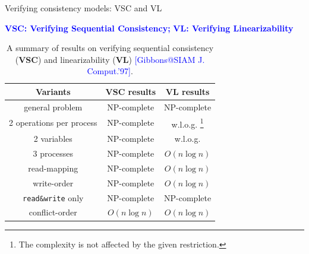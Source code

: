 \documentclass{beamer}
\makeatletter
\newcommand{\citeinbeamer}[3]{{\scriptsize{\textcolor{blue}{[#1@#2'#3]}}}}
\makeatother
\begin{document}
\begin{frame}{Verifying consistency models: VSC and VL}

  {\small \textcolor{blue}{\bf VSC: Verifying Sequential Consistency;}
  \textcolor{blue}{\bf VL: Verifying Linearizability}}

  \begin{table}[h]
    \centering
	\begin{tabular}{|c|c|c|}
      \hline
      {\bf \large Variants} & {\bf \large VSC results} & {\bf \large VL results}
      \\ \hline \hline
	  general problem & \textsf{NP}-complete & \textsf{NP}-complete
	  \\ \hline
	  2 operations per process & \textsf{NP}-complete & w.l.o.g.
	  \footnote[frame]{The complexity is not affected by the given restriction.}
	  \\
	  2 variables & \textsf{NP}-complete & w.l.o.g.\\
	  3 processes & \textsf{NP}-complete & $O(n \log n)$
	  \\ \hline
	  read-mapping & \textsf{NP}-complete &  $O(n \log n)$ \\
	  write-order & \textsf{NP}-complete &  $O(n \log n)$ \\
	  \texttt{read\&write} only & \textsf{NP}-complete & \textsf{NP}-complete \\
	  conflict-order & $O(n \log n)$ &  $O(n \log n)$
	  \\ \hline
	\end{tabular}
	\caption{A summary of results on verifying sequential consistency ({\bf VSC})
	and linearizability ({\bf VL}) \citeinbeamer{Gibbons}{SIAM J. Comput.}{97}.}
  \end{table}
\end{frame}
\end{document}
